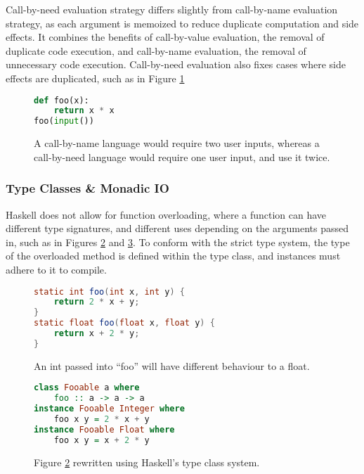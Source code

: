 Call-by-need evaluation strategy differs slightly from call-by-name evaluation strategy, as each argument is memoized to reduce duplicate computation and side effects. It combines the benefits of call-by-value evaluation, the removal of duplicate code execution, and call-by-name evaluation, the removal of unnecessary code execution. Call-by-need evaluation also fixes cases where side effects are duplicated, such as in Figure \ref{fig:side-effects}
\begin{figure}[t]
    \centering
    \begin{lstlisting}[language=Python]
def foo(x):
    return x * x
foo(input())\end{lstlisting}
    \caption{A call-by-name language would require two user inputs, whereas a call-by-need language would require one user input, and use it twice.}
    \label{fig:side-effects}
\end{figure}

\subsubsection{Type Classes \& Monadic IO}
Haskell does not allow for function overloading, where a function can have different type signatures, and different uses depending on the arguments passed in, such as in Figures \ref{fig:overloading} and \ref{fig:overloading-2}. To conform with the strict type system, the type of the overloaded method is defined within the type class, and instances must adhere to it to compile.

\begin{figure}
    \centering
    \begin{lstlisting}[language=Java]
static int foo(int x, int y) {
    return 2 * x + y;
}
static float foo(float x, float y) {
    return x + 2 * y;
}\end{lstlisting}
    \caption{An int passed into ``foo'' will have different behaviour to a float.}
    \label{fig:overloading}
\end{figure}

\begin{figure}
    \centering
    \begin{lstlisting}[language=Haskell]
class Fooable a where
    foo :: a -> a -> a
instance Fooable Integer where
    foo x y = 2 * x + y
instance Fooable Float where
    foo x y = x + 2 * y
\end{lstlisting}
    \caption{Figure \ref{fig:overloading} rewritten using Haskell's type class system.}
    \label{fig:overloading-2}
\end{figure}

